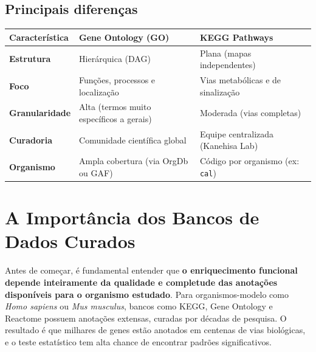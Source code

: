 \documentclass[
  letterpaper,
  DIV=11,
  numbers=noendperiod]{scrreprt}
\begin{document}
\subsection{Principais diferenças}\label{principais-diferenuxe7as}

\begin{longtable}[]{@{}
  >{\raggedright\arraybackslash}p{}
  >{\raggedright\arraybackslash}p{}
  >{\raggedright\arraybackslash}p{}@{}}
\toprule\noalign{}
\begin{minipage}[b]{\linewidth}\raggedright
Característica
\end{minipage} & \begin{minipage}[b]{\linewidth}\raggedright
Gene Ontology (GO)
\end{minipage} & \begin{minipage}[b]{\linewidth}\raggedright
KEGG Pathways
\end{minipage} \\
\midrule\noalign{}
\endhead
\bottomrule\noalign{}
\endlastfoot
\textbf{Estrutura} & Hierárquica (DAG) & Plana (mapas independentes) \\
\textbf{Foco} & Funções, processos e localização & Vias metabólicas e de
sinalização \\
\textbf{Granularidade} & Alta (termos muito específicos a gerais) &
Moderada (vias completas) \\
\textbf{Curadoria} & Comunidade científica global & Equipe centralizada
(Kanehisa Lab) \\
\textbf{Organismo} & Ampla cobertura (via OrgDb ou GAF) & Código por
organismo (ex: \texttt{cal}) \\
\end{longtable}

\section{A Importância dos Bancos de Dados
Curados}\label{a-importuxe2ncia-dos-bancos-de-dados-curados}

Antes de começar, é fundamental entender que \textbf{o enriquecimento
funcional depende inteiramente da qualidade e completude das anotações
disponíveis para o organismo estudado}. Para organismos-modelo como
\emph{Homo sapiens} ou \emph{Mus musculus}, bancos como KEGG, Gene
Ontology e Reactome possuem anotações extensas, curadas por décadas de
pesquisa. O resultado é que milhares de genes estão anotados em centenas
de vias biológicas, e o teste estatístico tem alta chance de encontrar
padrões significativos.
\end{document}
